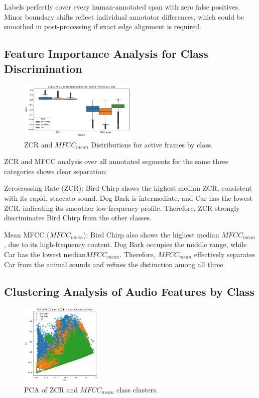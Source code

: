 \documentclass{article}
\begin{document}
\FloatBarrier

Labels perfectly cover every human-annotated span with zero false positives. Minor boundary shifts reflect individual annotator differences, which could be smoothed in post-processing if exact edge alignment is required.

\subsection{Feature Importance Analysis for Class Discrimination}

\begin{figure}[ht]
    \centering
    \includegraphics[width=0.5\textwidth]{figures/task1b.png}
    \caption{ZCR and $MFCC_{mean}$ Distributions for active frames by class.}
    \label{Task1_B}
\end{figure}

ZCR and MFCC analysis over all annotated segments for the same three categories shows clear separation:

Zerocrossing Rate (ZCR): Bird Chirp shows the highest median ZCR, consistent with its rapid, staccato sound. Dog Bark is intermediate, and Car has the lowest ZCR, indicating its smoother low-frequency profile. Therefore, ZCR strongly discriminates Bird Chirp from the other classes.

Mean MFCC ($MFCC_{mean}$): Bird Chirp also shows the highest median $MFCC_{mean}$, due to its high-frequency content. Dog Bark occupies the middle range, while Car has the lowest median$MFCC_{mean}$. Therefore, $MFCC_{mean}$ effectively separates Car from the animal sounds and refines the distinction among all three.

\subsection{Clustering Analysis of Audio Features by Class}

\begin{figure}[ht]
    \centering
    \includegraphics[width=0.35\textwidth]{figures/task1c.png}
    \caption{PCA of ZCR and $MFCC_{mean}$ class clusters.}
    \label{Task1_C}
\end{figure}
\end{document}
